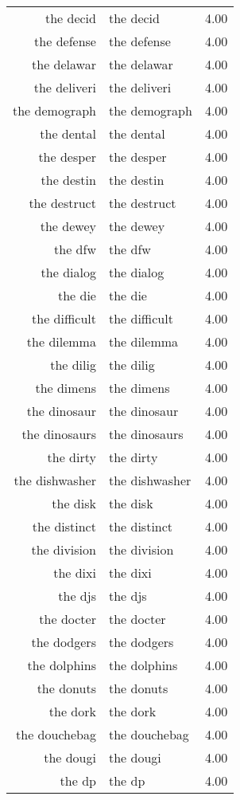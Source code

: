 \begin{table}[ht]
\begin{tabular}{rlr}
  the decid & the decid & 4.00 \\ 
  the defense & the defense & 4.00 \\ 
  the delawar & the delawar & 4.00 \\ 
  the deliveri & the deliveri & 4.00 \\ 
  the demograph & the demograph & 4.00 \\ 
  the dental & the dental & 4.00 \\ 
  the desper & the desper & 4.00 \\ 
  the destin & the destin & 4.00 \\ 
  the destruct & the destruct & 4.00 \\ 
  the dewey & the dewey & 4.00 \\ 
  the dfw & the dfw & 4.00 \\ 
  the dialog & the dialog & 4.00 \\ 
  the die & the die & 4.00 \\ 
  the difficult & the difficult & 4.00 \\ 
  the dilemma & the dilemma & 4.00 \\ 
  the dilig & the dilig & 4.00 \\ 
  the dimens & the dimens & 4.00 \\ 
  the dinosaur & the dinosaur & 4.00 \\ 
  the dinosaurs & the dinosaurs & 4.00 \\ 
  the dirty & the dirty & 4.00 \\ 
  the dishwasher & the dishwasher & 4.00 \\ 
  the disk & the disk & 4.00 \\ 
  the distinct & the distinct & 4.00 \\ 
  the division & the division & 4.00 \\ 
  the dixi & the dixi & 4.00 \\ 
  the djs & the djs & 4.00 \\ 
  the docter & the docter & 4.00 \\ 
  the dodgers & the dodgers & 4.00 \\ 
  the dolphins & the dolphins & 4.00 \\ 
  the donuts & the donuts & 4.00 \\ 
  the dork & the dork & 4.00 \\ 
  the douchebag & the douchebag & 4.00 \\ 
  the dougi & the dougi & 4.00 \\ 
  the dp & the dp & 4.00 \\ 

\end{tabular}
\end{table}
